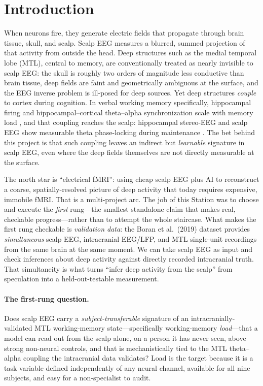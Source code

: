 \documentclass[11pt]{article}
\begin{document}
\section{Introduction}
\label{sec:intro}

When neurons fire, they generate electric fields that propagate through brain tissue, skull, and
scalp. Scalp EEG measures a blurred, summed projection of that activity from outside the head.
Deep structures such as the medial temporal lobe (MTL), central to memory, are conventionally
treated as nearly invisible to scalp EEG: the skull is roughly two orders of magnitude less
conductive than brain tissue, deep fields are faint and geometrically ambiguous at the surface,
and the EEG inverse problem is ill-posed for deep sources. Yet deep structures \emph{couple} to
cortex during cognition. In verbal working memory specifically, hippocampal firing and
hippocampal--cortical theta--alpha synchronization scale with memory load
\cite{boran2019persistent}, and that coupling reaches the scalp: hippocampal stereo-EEG and scalp
EEG show measurable theta phase-locking during maintenance \cite{fedele2020functional}. The bet
behind this project is that such coupling leaves an indirect but \emph{learnable} signature in
scalp EEG, even where the deep fields themselves are not directly measurable at the surface.

The north star is ``electrical fMRI'': using cheap scalp EEG plus AI to reconstruct a coarse,
spatially-resolved picture of deep activity that today requires expensive, immobile fMRI. That is
a multi-project arc. The job of this Station was to choose and execute the \emph{first} rung---the
smallest standalone claim that makes real, checkable progress---rather than to attempt the whole
staircase. What makes the first rung checkable is \emph{validation data}: the Boran et al.\ (2019)
dataset \cite{boran2019dataset} provides \emph{simultaneous} scalp EEG, intracranial EEG/LFP, and
MTL single-unit recordings from the same brain at the same moment. We can take scalp EEG as input
and check inferences about deep activity against directly recorded intracranial truth. That
simultaneity is what turns ``infer deep activity from the scalp'' from speculation into a
held-out-testable measurement.

\paragraph{The first-rung question.} Does scalp EEG carry a \emph{subject-transferable} signature
of an intracranially-validated MTL working-memory state---specifically working-memory
\emph{load}---that a model can read out from the scalp alone, on a person it has never seen, above
strong non-neural controls, and that is mechanistically tied to the MTL theta--alpha coupling the
intracranial data validates? Load is the target because it is a task variable defined
independently of any neural channel, available for all nine subjects, and easy for a
non-specialist to audit.
\end{document}
